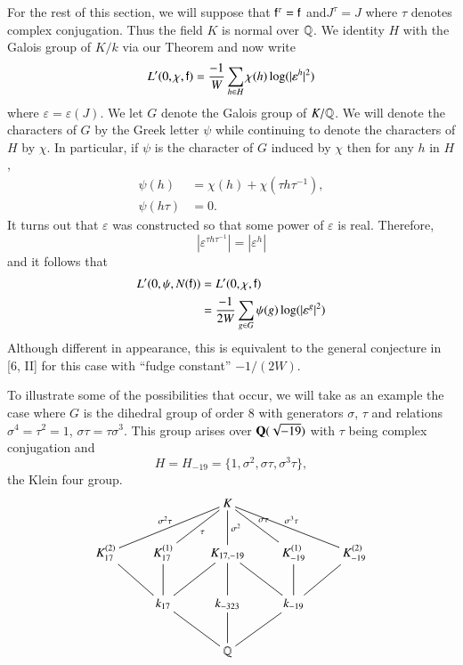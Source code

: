 For the rest of this section, we will suppose that $\mathsf{f}^\tau = \mathsf{f}$ and$J^\tau = J$ where $\tau$ denotes complex conjugation. Thus the field $K$ is normal over $\mathbb{Q}$. We identity $H$ with the Galois group of $K/k$ via our Theorem and now write\pageoriginale 
$$
L' (0, \chi, \mathsf{f}) = \frac{-1}{W} \sum\limits_{h \in H} \chi (h) \log (|\varepsilon^h|^2)
$$
where $\varepsilon = \varepsilon (J)$. We let $G$ denote the Galois group of $K/\mathbb{Q}$. We will denote the characters of $G$ by the Greek letter $\psi$ while continuing to denote the characters of $H$ by $\chi$. In particular, if $\psi$ is the character of $G$ induced by $\chi$ then for any $h$ in $H$,
\begin{align*}
\psi (h) & = \chi (h) + \chi (\tau h \tau^{-1}),\\
\psi (h\tau) & = 0.
\end{align*}
It turns out that $\varepsilon$ was constructed so that some power of $\varepsilon$ is real. Therefore,
$$
|\varepsilon^{\tau h \tau^{-1}}| = |\varepsilon^h|
$$
and it follows that 
\begin{align*}
L'(0,\psi, N (\mathsf{f})) & = L'(0, \chi, \mathsf{f})\\
& = \frac{-1}{2W} \sum\limits_{g \in G} \psi (g) \log (|\varepsilon^g|^2)
\end{align*}
Although different in appearance, this is equivalent to the general conjecture in [6, II] for this case with ``fudge constant'' $-1/(2W)$.

To illustrate some of the possibilities that occur, we will take as an example the case where $G$ is the dihedral group of order 8 with generators $\sigma$, $\tau$ and relations $\sigma^4 = \tau^2 = 1$, $\sigma \tau = \tau \sigma^3$. This group arises over $\mathbf{Q} (\sqrt{-19})$ with $\tau$ being complex conjugation and 
$$
H = H_{-19} = \{1, \sigma^2, \sigma \tau, \sigma^3 \tau\},
$$
the Klein four group. 
$$
\xymatrix{
& & K \ar@{-}[d]^-{\sigma^2} \ar@{-}[dll]_-{\sigma^2 \tau} \ar@{-}[dl]^-{\tau} \ar@{-}[dr]^-{\sigma \tau} \ar@{-}[drr]^-{\sigma^3 \tau} & & \\
K^{(2)}_{17} \ar@{-}[dr]& K^{(1)}_{17} \ar@{-}[d] & K_{17, -19} \ar@{-}[d] \ar@{-}[dr]\ar@{-}[dl] & K^{(1)}_{-19} \ar@{-}[d]& K^{(2)}_{-19} \ar@{-}[dl]\\
& k_{17}  \ar@{-}[dr]& k_{-323}\ar@{-}[d] & k_{-19} \ar@{-}[dl]& \\
& & \bbQ& & 
}
$$

